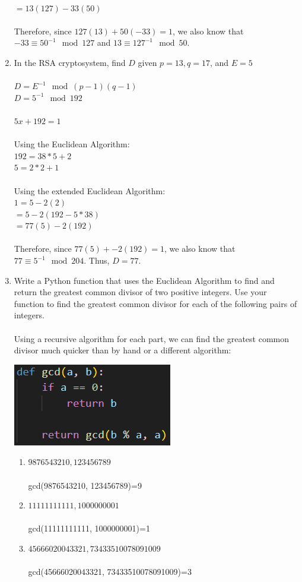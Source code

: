 \documentclass[]{article}
\begin{document}
\begin{enumerate}
    \\$=13(127)-33(50)$
    \\\\Therefore, since $127(13)+50(-33)=1$, we also know that $-33 \equiv 50^{-1} \mod 127$ and $13 \equiv 127^{-1} \mod 50$.
    \item In the RSA cryptosystem, find $D$ given $p=13,q=17$, and $E=5$
    \\\\$D=E^{-1} \mod (p-1)(q-1)$
    \\$D=5^{-1} \mod 192$
    \\\\$5x+192=1$
    \\\\Using the Euclidean Algorithm:
    \\$192=38*5+2$
    \\$5=2*2+1$
    \\\\Using the extended Euclidean Algorithm:
    \\$1=5-2(2)$
    \\$=5-2(192-5*38)$
    \\$=77(5)-2(192)$
    \\\\Therefore, since $77(5)+-2(192)=1$, we also know that $77 \equiv 5^{-1} \mod 204$. Thus, $D=77$.
    \item Write a Python function that uses the Euclidean Algorithm to find and return the greatest common divisor of two positive integers. Use your function to find the greatest common divisor for each of the following pairs of integers.
    \\\\Using a recursive algorithm for each part, we can find the greatest common divisor much quicker than by hand or a different algorithm:
    \begin{center}
        \includegraphics[scale=0.5]{EuclidAlgo.png}
    \end{center}
    \begin{enumerate}
        \item $9876543210, 123456789$
        \\\\gcd(9876543210, 123456789)=9
        \item $11111111111, 1000000001$
        \\\\gcd(11111111111, 1000000001)=1
        \item $45666020043321, 73433510078091009$
        \\\\gcd(45666020043321, 73433510078091009)=3
    \end{enumerate}


\end{enumerate}
\end{document}
